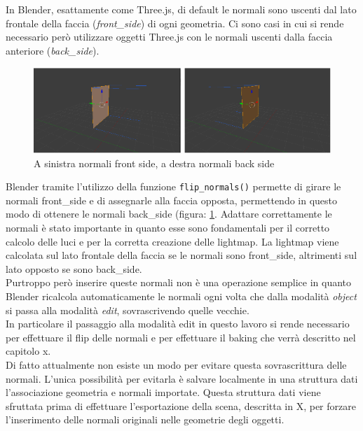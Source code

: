 In Blender, esattamente come Three.js, di default le normali sono uscenti dal lato frontale della faccia (\emph{front\_side}) di ogni geometria. 
Ci sono casi in cui si rende necessario però utilizzare oggetti Three.js con le normali uscenti dalla faccia anteriore (\emph{back\_side}).
\\
\begin{figure}[htb]
 \centering
 \includegraphics[width=1\linewidth]{images/chapter_baking_service/front_back_side.png}\hfill
 \caption[Front side e back side in Blender.]{A sinistra normali front side, a destra normali back side}
 \label{fig:baking_service_front_back_side}
\end{figure}
Blender tramite l’utilizzo della funzione \texttt{flip\_normals()} permette di girare le normali front\_side e di assegnarle alla faccia opposta, permettendo in questo modo di ottenere le normali back\_side (figura: \ref{fig:baking_service_front_back_side}. 
Adattare correttamente le normali è stato importante in quanto esse sono fondamentali per il corretto calcolo delle luci e per la corretta creazione delle lightmap.
La lightmap viene calcolata sul lato frontale della faccia se le normali sono front\_side, altrimenti sul lato opposto se sono back\_side.
\\
Purtroppo però inserire queste normali non è una operazione semplice in quanto Blender ricalcola automaticamente le normali ogni volta che dalla modalità \emph{object} si passa alla modalità \emph{edit}, sovrascrivendo quelle vecchie.
\\
In particolare il passaggio alla modalità edit  in questo lavoro si rende necessario per effettuare il flip delle normali e per effettuare il baking che verrà descritto nel capitolo x.
\\
Di fatto attualmente non esiste un modo per evitare questa sovrascrittura delle normali. L’unica possibilità per evitarla è salvare localmente in una struttura dati l’associazione geometria e normali importate. Questa struttura dati viene sfruttata prima di effettuare l’esportazione della scena, descritta in X, per forzare l’inserimento delle normali originali nelle geometrie degli oggetti.
